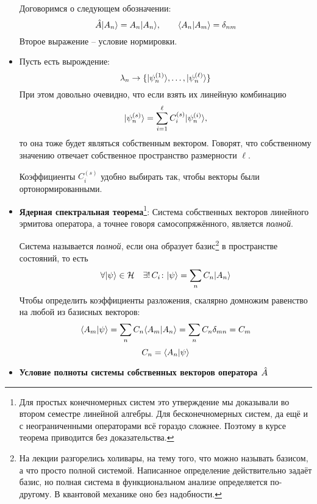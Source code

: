\begin{itemize}
    Договоримся о следующем обозначении:
    $$
        \Hat A | A_n \rangle = A_n | A_n \rangle, \qquad \langle A_n | A_m \rangle = \delta_{nm}
    $$
Второе выражение -- условие нормировки.
    \item Пусть есть вырождение:
  $$
    \lambda_n \to \{ | \psi_n^{(1)} \rangle, \ldots, | \psi_n^{(\ell)} \rangle \}
  $$
  При этом довольно очевидно, что если взять их линейную комбинацию
  $$
    | \psi_n^{(s)} \rangle = \sum_{i=1}^\ell C_i^{(s)} | \psi_n^{(i)} \rangle,
  $$
  то она тоже будет являться собственным вектором. Говорят, что собственному значению отвечает собственное пространство размерности $\ell$.

  Коэффициенты $C_i^{(s)}$ удобно выбирать так, чтобы векторы были ортонормированными.

  \item \textbf{Ядерная спектральная теорема}\footnote{Для простых конечномерных систем это утверждение мы доказывали во втором семестре линейной алгебры. Для бесконечномерных систем, да ещё и с неограниченными операторами всё гораздо сложнее. Поэтому в курсе теорема приводится без доказательства.\Lector}: Система собственных векторов линейного эрмитова оператора, а точнее говоря самосопряжённого, является \emph{полной}.

  \Def Система называется \emph{полной}, если она образует базис\footnote{На лекции разгорелись холивары, на тему того, что можно называть базисом, а что просто полной системой. Написанное определение действительно задаёт базис, но полная система в функциональном анализе определяется по-другому. В квантовой механике оно без надобности. \Sergey} в пространстве состояний, то есть
    $$
\forall | \psi \rangle \in \mathcal H \quad \exists ! \, C_i \colon | \psi \rangle = \sum_n C_n | A_n \rangle
    $$
    Чтобы определить коэффициенты разложения, скалярно домножим равенство на любой из базисных векторов:
    $$
        \langle A_m | \psi \rangle = \sum_n C_n \langle A_m | A_n \rangle = \sum_n C_n \delta_{mn} = C_m
    $$
    $$
        C_n = \langle A_n | \psi \rangle
    $$
    \item   \textbf{Условие полноты системы собственных векторов оператора $\Hat A$}


\end{itemize}
